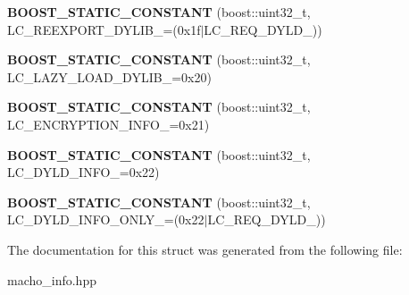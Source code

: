 \begin{DoxyCompactItemize}
\item 
\mbox{\label{a01552_a0247764b2b43e242f023b0eebc837a0a}} 
{\bfseries B\+O\+O\+S\+T\+\_\+\+S\+T\+A\+T\+I\+C\+\_\+\+C\+O\+N\+S\+T\+A\+NT} (boost\+::uint32\+\_\+t, L\+C\+\_\+\+R\+E\+E\+X\+P\+O\+R\+T\+\_\+\+D\+Y\+L\+I\+B\+\_\+=(0x1f$\vert$\+L\+C\+\_\+\+R\+E\+Q\+\_\+\+D\+Y\+L\+D\+\_\+))
\item 
\mbox{\label{a01552_ac214e94605692e614cd5807fdbbd102c}} 
{\bfseries B\+O\+O\+S\+T\+\_\+\+S\+T\+A\+T\+I\+C\+\_\+\+C\+O\+N\+S\+T\+A\+NT} (boost\+::uint32\+\_\+t, L\+C\+\_\+\+L\+A\+Z\+Y\+\_\+\+L\+O\+A\+D\+\_\+\+D\+Y\+L\+I\+B\+\_\+=0x20)
\item 
\mbox{\label{a01552_af5741adbd7ba5f8147f3422f53c75a56}} 
{\bfseries B\+O\+O\+S\+T\+\_\+\+S\+T\+A\+T\+I\+C\+\_\+\+C\+O\+N\+S\+T\+A\+NT} (boost\+::uint32\+\_\+t, L\+C\+\_\+\+E\+N\+C\+R\+Y\+P\+T\+I\+O\+N\+\_\+\+I\+N\+F\+O\+\_\+=0x21)
\item 
\mbox{\label{a01552_ad9858a5a2228c52eaa996be04500887e}} 
{\bfseries B\+O\+O\+S\+T\+\_\+\+S\+T\+A\+T\+I\+C\+\_\+\+C\+O\+N\+S\+T\+A\+NT} (boost\+::uint32\+\_\+t, L\+C\+\_\+\+D\+Y\+L\+D\+\_\+\+I\+N\+F\+O\+\_\+=0x22)
\item 
\mbox{\label{a01552_aa651d683de90922a7a1e8234a06faa79}} 
{\bfseries B\+O\+O\+S\+T\+\_\+\+S\+T\+A\+T\+I\+C\+\_\+\+C\+O\+N\+S\+T\+A\+NT} (boost\+::uint32\+\_\+t, L\+C\+\_\+\+D\+Y\+L\+D\+\_\+\+I\+N\+F\+O\+\_\+\+O\+N\+L\+Y\+\_\+=(0x22$\vert$\+L\+C\+\_\+\+R\+E\+Q\+\_\+\+D\+Y\+L\+D\+\_\+))
\end{DoxyCompactItemize}


The documentation for this struct was generated from the following file\+:\begin{DoxyCompactItemize}
\item 
macho\+\_\+info.\+hpp\end{DoxyCompactItemize}
